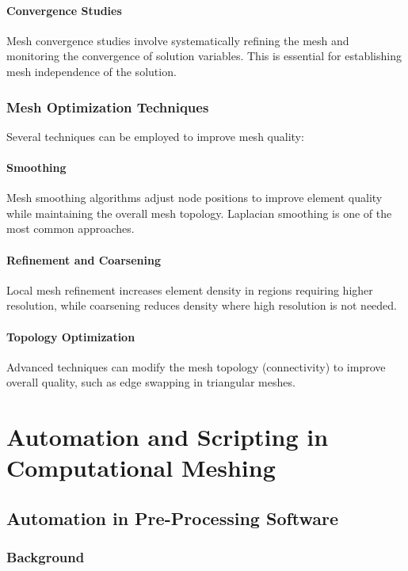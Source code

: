 \documentclass{book}
\begin{document}
\begin{itemize}[leftmargin=*,label=\textbullet]
\subsection{Convergence Studies}
Mesh convergence studies involve systematically refining the mesh and monitoring the convergence of solution variables. This is essential for establishing mesh independence of the solution.

\section{Mesh Optimization Techniques}

Several techniques can be employed to improve mesh quality:

\subsection{Smoothing}
Mesh smoothing algorithms adjust node positions to improve element quality while maintaining the overall mesh topology. Laplacian smoothing is one of the most common approaches.

\subsection{Refinement and Coarsening}
Local mesh refinement increases element density in regions requiring higher resolution, while coarsening reduces density where high resolution is not needed.
    
\subsection{Topology Optimization}
Advanced techniques can modify the mesh topology (connectivity) to improve overall quality, such as edge swapping in triangular meshes.



\part{Automation and Scripting in Computational Meshing}

\chapter{Automation in Pre-Processing Software}

\section{Background}


\end{itemize}
\end{document}
